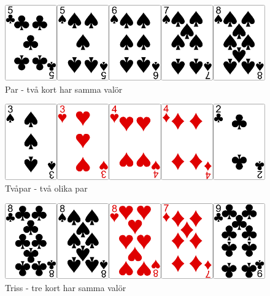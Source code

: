 \begin{figure}[H]
 \begin{minipage}[c]{0.5\textwidth}
  \includegraphics[width=\textwidth]{../img/w05-hands/pair.png}
 \end{minipage}
 \begin{minipage}[c]{0.3\textwidth}
  \caption{Par - två kort har samma valör}
   \label{lab:shuffle:first-picture}
 \end{minipage}
\end{figure}

\begin{figure}[H]
 \begin{minipage}[c]{0.5\textwidth}
  \includegraphics[width=\textwidth]{../img/w05-hands/twopair.png}
 \end{minipage}
 \begin{minipage}[c]{0.3\textwidth}
  \caption{Tvåpar - två olika par}
 \end{minipage}
\end{figure}

\begin{figure}[H]
 \begin{minipage}[c]{0.5\textwidth}
  \includegraphics[width=\textwidth]{../img/w05-hands/trips.png}
 \end{minipage}
 \begin{minipage}[c]{0.3\textwidth}
  \caption{Triss - tre kort har samma valör}
 \end{minipage}
\end{figure}

